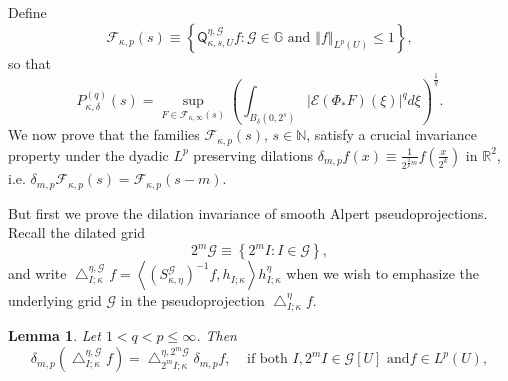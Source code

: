 \documentclass{amsart}%
\theoremstyle{plain}
\newtheorem{lemma}[theorem]{Lemma}
\numberwithin{equation}{section}
\begin{document}
Define%
\[
\mathcal{F}_{\kappa,p}\left(  s\right)  \equiv\left\{  \mathsf{Q}_{\kappa
,s,U}^{\eta,\mathcal{G}}f:\mathcal{G}\in\mathbb{G}\text{ and }\left\Vert
f\right\Vert _{L^{p}\left(  U\right)  }\leq1\right\}  ,
\]
so that%
\[
P_{\kappa,\delta}^{\left(  q\right)  }\left(  s\right)  =\sup_{F\in
\mathcal{F}_{\kappa,\infty}\left(  s\right)  }\left(  \int_{B_{\delta}\left(
0,2^{s}\right)  }\left\vert \mathcal{E}\left(  \Phi_{\ast}F\right)  \left(
\xi\right)  \right\vert ^{q}d\xi\right)  ^{\frac{1}{q}}.
\]
We now prove that the families $\mathcal{F}_{\kappa,p}\left(  s\right)  $,
$s\in\mathbb{N}$, satisfy a crucial invariance property under the dyadic
$L^{p}$ preserving dilations $\delta_{m,p}f\left(  x\right)  \equiv\frac
{1}{2^{\frac{2}{p}m}}f\left(  \frac{x}{2^{k}}\right)  $ in $\mathbb{R}^{2}$,
i.e. $\delta_{m,p}\mathcal{F}_{\kappa,p}\left(  s\right)  =\mathcal{F}%
_{\kappa,p}\left(  s-m\right)  $.

But first we prove the dilation invariance of smooth Alpert pseudoprojections.
Recall the dilated grid%
\[
2^{m}\mathcal{G}\equiv\left\{  2^{m}I:I\in\mathcal{G}\right\}  ,
\]
and write $\bigtriangleup_{I;\kappa}^{\eta,\mathcal{G}}f=\left\langle \left(
S_{\kappa,\eta}^{\mathcal{G}}\right)  ^{-1}f,h_{I;\kappa}\right\rangle
h_{I;\kappa}^{\eta}$ when we wish to emphasize the underlying grid
$\mathcal{G}$ in the pseudoprojection $\bigtriangleup_{I;\kappa}^{\eta}f$.

\begin{lemma}
\label{proj inv}Let $1<q<p\leq\infty$. Then%
\begin{equation}
\delta_{m,p}\left(  \bigtriangleup_{I;\kappa}^{\eta,\mathcal{G}}f\right)
=\bigtriangleup_{2^{m}I;\kappa}^{\eta,2^{m}\mathcal{G}}\delta_{m,p}%
f,\ \ \ \ \ \text{if both }I,2^{m}I\in\mathcal{G}\left[  U\right]  \text{ and
}f\in L^{p}\left(  U\right)  ,\label{inv}%
\end{equation}

\end{lemma}
\end{document}
